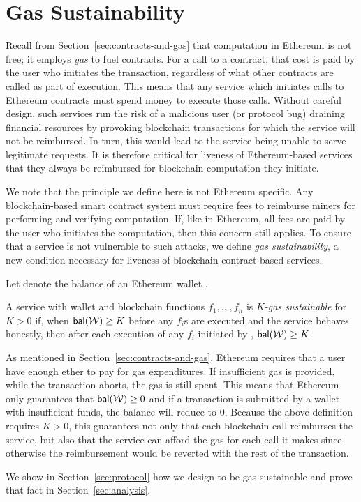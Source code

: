 \section{Gas Sustainability}
\label{sec:gas-sustainability}

Recall from Section~\ref{sec:contracts-and-gas} that computation in Ethereum is not free; it employs \emph{gas} to fuel contracts.
For a call to a contract, that cost is paid by the user who initiates the transaction, regardless of what other contracts are called as part of execution.
This means that any service which initiates calls to Ethereum contracts must spend money to execute those calls.
Without careful design, such services run the risk of a malicious user (or protocol bug) draining financial resources by provoking blockchain transactions for which the service will not be reimbursed.
In turn, this would lead to the service being unable to serve legitimate requests.
It is therefore critical for liveness of Ethereum-based services that they always be reimbursed for blockchain computation they initiate.

We note that the principle we define here is not Ethereum specific.
Any blockchain-based smart contract system must require fees to reimburse miners for performing and verifying computation.
If, like in Ethereum, all fees are paid by the user who initiates the computation, then this concern still applies.
To ensure that a service is not vulnerable to such attacks, we define \emph{gas sustainability}, a new condition necessary for liveness of blockchain contract-based services.

Let \bal{\wallet} denote the balance of an Ethereum wallet \wallet.

\begin{definition}
  \label{def:gas-sustainability}
  A service with wallet \wallet and blockchain functions $f_1, \dotsc, f_n$ is \emph{$K$-gas sustainable} for $K > 0$ if,
  when $\bal{\wallet} \geq K$ before any $f_i$s are executed and the service behaves honestly,
  then after each execution of any $f_i$ initiated by \wallet, $\bal{\wallet} \geq K$.
\end{definition}

As mentioned in Section~\ref{sec:contracts-and-gas}, Ethereum requires that a user have enough ether to pay for gas expenditures.
If insufficient gas is provided, while the transaction aborts, the gas is still spent.
This means that Ethereum only guarantees that $\bal{\wallet} \geq 0$ and if a transaction is submitted by a wallet with insufficient funds, the balance will reduce to 0.
Because the above definition requires $K > 0$, this guarantees not only that each blockchain call reimburses the service,
but also that the service can afford the gas for each call it makes since otherwise the reimbursement would be reverted with the rest of the transaction.

We show in Section~\ref{sec:protocol} how we design \tc to be gas sustainable and prove that fact in Section~\ref{sec:analysis}.

